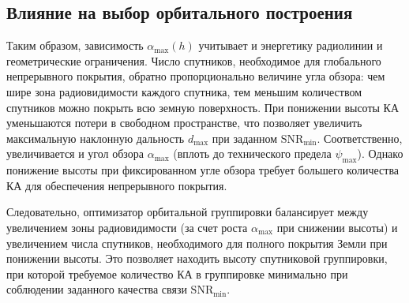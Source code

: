 \subsection{Влияние на выбор орбитального построения}

Таким образом, зависимость $\alpha_{\max}(h)$ учитывает и 
энергетику радиолинии и геометрические ограничения.
Число спутников, необходимое для глобального непрерывного покрытия,
обратно пропорционально величине угла обзора: чем шире зона радиовидимости
каждого спутника, тем меньшим количеством спутников можно покрыть всю
земную поверхность.
При понижении высоты КА уменьшаются потери в свободном
пространстве, что позволяет увеличить максимальную наклонную
дальность $d_{\max}$ при заданном $\mathrm{SNR}_{\min}$.
Соответственно, увеличивается и угол обзора $\alpha_{\max}$ (вплоть
до технического предела $\psi_{\max}$). 
Однако понижение высоты при фиксированном угле обзора требует
большего количества КА для обеспечения непрерывного покрытия. 

Следовательно, оптимизатор орбитальной группировки балансирует
между увеличением зоны радиовидимости (за счет
роста $\alpha_{\max}$ при снижении высоты) и увеличением числа
спутников, необходимого для полного покрытия Земли при понижении высоты. Это
позволяет находить высоту спутниковой группировки, при которой требуемое
количество КА в группировке минимально при соблюдении заданного
качества связи $\mathrm{SNR}_{\min}$.


